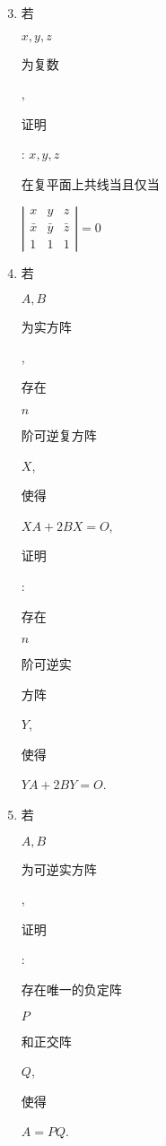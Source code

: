 \documentclass[10pt]{article}
\begin{document}
\begin{enumerate}
  \setcounter{enumi}{2}
  \item \begin{CJK}{UTF8}{mj}若\end{CJK} $x, y, z$ \begin{CJK}{UTF8}{mj}为复数\end{CJK}, \begin{CJK}{UTF8}{mj}证明\end{CJK}: $x, y, z$ \begin{CJK}{UTF8}{mj}在复平面上共线当且仅当\end{CJK} $\left|\begin{array}{ccc}x & y & z \\ \bar{x} & \bar{y} & \bar{z} \\ 1 & 1 & 1\end{array}\right|=0$

  \item \begin{CJK}{UTF8}{mj}若\end{CJK} $A, B$ \begin{CJK}{UTF8}{mj}为实方阵\end{CJK}, \begin{CJK}{UTF8}{mj}存在\end{CJK} $n$ \begin{CJK}{UTF8}{mj}阶可逆复方阵\end{CJK} $X$, \begin{CJK}{UTF8}{mj}使得\end{CJK} $X A+2 B X=O$, \begin{CJK}{UTF8}{mj}证明\end{CJK}: \begin{CJK}{UTF8}{mj}存在\end{CJK} $n$ \begin{CJK}{UTF8}{mj}阶可逆实\end{CJK} \begin{CJK}{UTF8}{mj}方阵\end{CJK} $Y$, \begin{CJK}{UTF8}{mj}使得\end{CJK} $Y A+2 B Y=O$.

  \item \begin{CJK}{UTF8}{mj}若\end{CJK} $A, B$ \begin{CJK}{UTF8}{mj}为可逆实方阵\end{CJK}, \begin{CJK}{UTF8}{mj}证明\end{CJK}: \begin{CJK}{UTF8}{mj}存在唯一的负定阵\end{CJK} $P$ \begin{CJK}{UTF8}{mj}和正交阵\end{CJK} $Q$, \begin{CJK}{UTF8}{mj}使得\end{CJK} $A=P Q$.


\end{enumerate}
\end{document}
